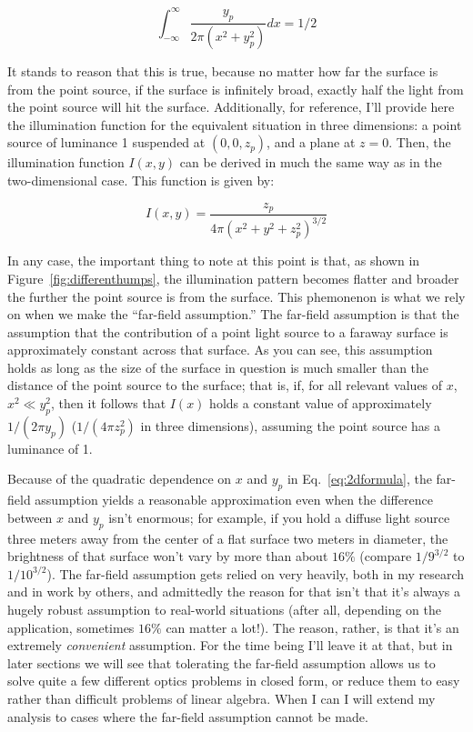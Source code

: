 $$\int_{-\infty}^\infty \frac{y_p}{2\pi(x^2 + y_p^2)} dx = 1/2$$

It stands to reason that this is true, because no matter how far the surface is from the point source, if the surface is infinitely broad, exactly half the light from the point source will hit the surface. Additionally, for reference, I'll provide here the illumination function for the equivalent situation in three dimensions: a point source of luminance 1 suspended at $(0, 0, z_p)$, and a plane at $z=0$. Then, the illumination function $I(x, y)$ can be derived in much the same way as in the two-dimensional case. This function is given by:

$$I(x, y) = \frac{z_p}{4\pi(x^2 + y^2 + z_p^2)^{3/2}}$$

In any case, the important thing to note at this point is that, as shown in Figure~\ref{fig:differenthumps}, the illumination pattern becomes flatter and broader the further the point source is from the surface. This phemonenon is what we rely on when we make the ``far-field assumption.'' The far-field assumption is that the assumption that the contribution of a point light source to a faraway surface is approximately constant across that surface. As you can see, this assumption holds as long as the size of the surface in question is much smaller than the distance of the point source to the surface; that is, if, for all relevant values of $x$, $x^2 \ll y_p^2$, then it follows that $I(x)$ holds a constant value of approximately $1/(2\pi y_p)$ ($1/(4\pi z_p^2)$ in three dimensions), assuming the point source has a luminance of 1. 

Because of the quadratic dependence on $x$ and $y_p$ in Eq.~\ref{eq:2dformula}, the far-field assumption yields a reasonable approximation even when the difference between $x$ and $y_p$ isn't enormous; for example, if you hold a diffuse light source three meters away from the center of a flat surface two meters in diameter, the brightness of that surface won't vary by more than about $16\%$ (compare $1/9^{3/2}$ to $1/10^{3/2}$). The far-field assumption gets relied on very heavily, both in my research and in work by others, and admittedly the reason for that isn't that it's always a hugely robust assumption to real-world situations (after all, depending on the application, sometimes $16\%$ can matter a lot!). The reason, rather, is that it's an extremely \emph{convenient} assumption. For the time being I'll leave it at that, but in later sections we will see that tolerating the far-field assumption allows us to solve quite a few different optics problems in closed form, or reduce them to easy rather than difficult problems of linear algebra. When I can I will extend my analysis to cases where the far-field assumption cannot be made.

